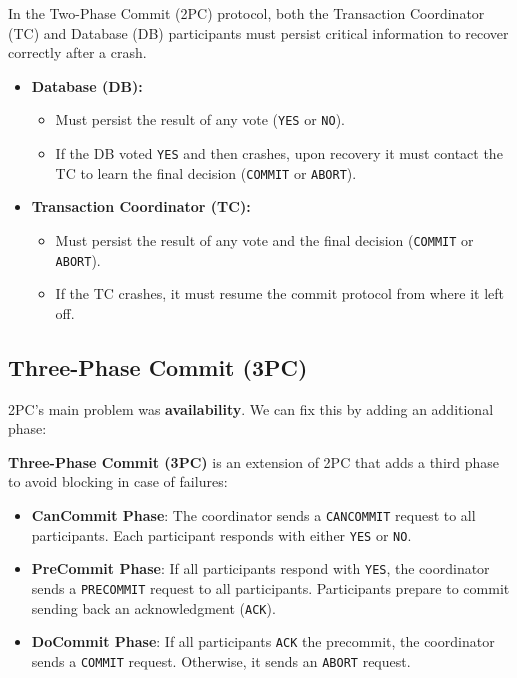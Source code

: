 \begin{Def}

    In the Two-Phase Commit (2PC) protocol, both the Transaction Coordinator (TC) and Database (DB) participants must persist critical information to recover correctly after a crash.

    \begin{itemize}
        \item \textbf{Database (DB):}
        \begin{itemize}
            \item Must persist the result of any vote (\texttt{YES} or \texttt{NO}).
            \item If the DB voted \texttt{YES} and then crashes, upon recovery it must contact the TC to learn the final decision (\texttt{COMMIT} or \texttt{ABORT}).
        \end{itemize}

        \item \textbf{Transaction Coordinator (TC):}
        \begin{itemize}
            \item Must persist the result of any vote and the final decision (\texttt{COMMIT} or \texttt{ABORT}).
            \item If the TC crashes, it must resume the commit protocol from where it left off.
        \end{itemize}
    \end{itemize}

\end{Def}





\newpage 
\subsection{Three-Phase Commit (3PC)}
\noindent
2PC's main problem was \textbf{availability}. We can fix this by adding an additional phase:
\begin{Def}

    \textbf{Three-Phase Commit (3PC)} is an extension of 2PC that adds a third phase to avoid blocking in case of failures:
    
    \begin{itemize}
        \item \textbf{CanCommit Phase}: The coordinator sends a \texttt{CANCOMMIT} request to all participants. Each participant responds with either \texttt{YES} or \texttt{NO}.
        \item \textbf{PreCommit Phase}: If all participants respond with \texttt{YES}, the coordinator sends a \texttt{PRECOMMIT} request to all participants. Participants prepare to commit sending back an acknowledgment (\texttt{ACK}).
        \item \textbf{DoCommit Phase}: If all participants \texttt{ACK} the precommit, the coordinator sends a \texttt{COMMIT} request. Otherwise, it sends an \texttt{ABORT} request.
    \end{itemize}
\end{Def}

